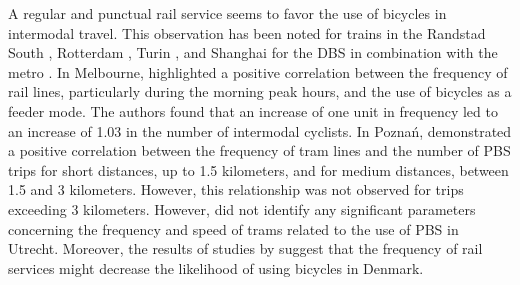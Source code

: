 \begin{refsegment}
A regular and punctual rail service seems to favor the use of bicycles in intermodal travel. This observation has been noted for trains in the Randstad South \textcolor{blue}{\autocite[45]{la_paix_puello_modelling_2015}}, Rotterdam \textcolor{blue}{\autocite[5]{montes_shared_2023}}, Turin \textcolor{blue}{\autocite[12]{staricco_implementing_2020}}, and Shanghai for the \acrshort{DBS} in combination with the metro \textcolor{blue}{\autocite[24]{lin_analysis_2019}}. In Melbourne, \textcolor{blue}{\textcite[401]{weliwitiya_bicycle_2019}} highlighted a positive correlation between the frequency of rail lines, particularly during the morning peak hours, and the use of bicycles as a feeder mode. The authors found that an increase of one unit in frequency led to an increase of 1.03 in the number of intermodal cyclists. In Poznań, \textcolor{blue}{\textcite[199]{radzimski_exploring_2021}} demonstrated a positive correlation between the frequency of tram lines and the number of \acrshort{PBS} trips for short distances, up to 1.5 kilometers, and for medium distances, between 1.5 and 3 kilometers. However, this relationship was not observed for trips exceeding 3 kilometers. However, \textcolor{blue}{\textcite[301]{kuijk_preferences_2022}} did not identify any significant parameters concerning the frequency and speed of trams related to the use of \acrshort{PBS} in Utrecht. Moreover, the results of studies by \textcolor{blue}{\textcite[41]{nielsen_bikeability_2018}} suggest that the frequency of rail services might decrease the likelihood of using bicycles in Denmark.%


\end{refsegment}
